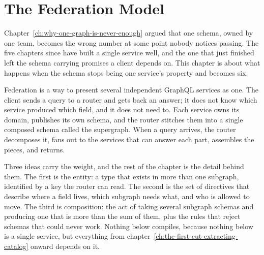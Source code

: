 \chapter{The Federation Model}
\label{ch:the-federation-model}

Chapter~\ref{ch:why-one-graph-is-never-enough} argued that one schema, owned by
one team, becomes the wrong number at some point nobody notices passing. The five
chapters since have built a single service well, and the one that just finished
left the schema carrying promises a client depends on. This chapter is about
what happens when the schema stops being one service's property and becomes six.

Federation is a way to present several independent GraphQL services as one. The
client sends a query to a router and gets back an answer; it does not know which
service produced which field, and it does not need to. Each service owns its
domain, publishes its own schema, and the router stitches them into a single
composed schema called the supergraph. When a query arrives, the router
decomposes it, fans out to the services that can answer each part, assembles the
pieces, and returns.

Three ideas carry the weight, and the rest of the chapter is the detail behind
them. The first is the entity: a type that exists in more than one subgraph,
identified by a key the router can read. The second is the set of directives
that describe where a field lives, which subgraph needs what, and who is allowed
to move. The third is composition: the act of taking several subgraph schemas
and producing one that is more than the sum of them, plus the rules that reject
schemas that could never work. Nothing below compiles, because nothing below is
a single service, but everything from
chapter~\ref{ch:the-first-cut-extracting-catalog} onward depends on it.







